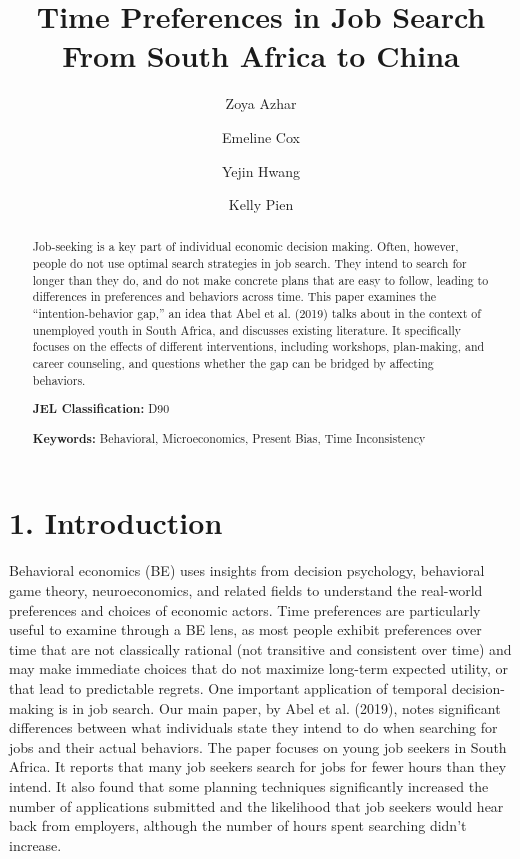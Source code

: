 \documentclass[]{elsarticle} %
\begin{document}
\begin{frontmatter}

  \title{Time Preferences in Job Search From South Africa to China}
    \author[Smith College]{Zoya Azhar}
    \author[Smith College]{Emeline Cox}
  
    \author[Smith College]{Yejin Hwang}
  
    \author[Smith College]{Kelly Pien}
  
      \address[Smith College]{Department of Economics, Pierce Hall, Northapmton, MA, 01063}
  
  \begin{abstract}
  Job-seeking is a key part of individual economic decision making. Often,
  however, people do not use optimal search strategies in job search. They
  intend to search for longer than they do, and do not make concrete plans
  that are easy to follow, leading to differences in preferences and
  behaviors across time. This paper examines the ``intention-behavior
  gap,'' an idea that Abel et al. (2019) talks about in the context of
  unemployed youth in South Africa, and discusses existing literature. It
  specifically focuses on the effects of different interventions,
  including workshops, plan-making, and career counseling, and questions
  whether the gap can be bridged by affecting behaviors. \par
  \textbf{JEL Classification:} D90 \par
  \textbf{Keywords:} Behavioral, Microeconomics, Present Bias, Time
  Inconsistency
  \end{abstract}
  
 \end{frontmatter}

\section{1. Introduction}\label{introduction}

Behavioral economics (BE) uses insights from decision psychology,
behavioral game theory, neuroeconomics, and related fields to understand
the real-world preferences and choices of economic actors. Time
preferences are particularly useful to examine through a BE lens, as
most people exhibit preferences over time that are not classically
rational (not transitive and consistent over time) and may make
immediate choices that do not maximize long-term expected utility, or
that lead to predictable regrets. One important application of temporal
decision-making is in job search. Our main paper, by Abel et al. (2019),
notes significant differences between what individuals state they intend
to do when searching for jobs and their actual behaviors. The paper
focuses on young job seekers in South Africa. It reports that many job
seekers search for jobs for fewer hours than they intend. It also found
that some planning techniques significantly increased the number of
applications submitted and the likelihood that job seekers would hear
back from employers, although the number of hours spent searching didn't
increase.
\end{document}
